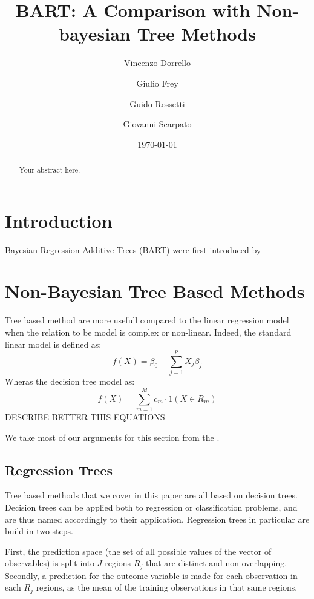 \documentclass[a4paper,11pt]{article}
\title{BART: A Comparison with Non-bayesian Tree Methods}
\author{
    Vincenzo Dorrello 
    \and
    Giulio Frey 
    \and
    Guido Rossetti 
    \and
    Giovanni Scarpato 
}
\date{\today}
\begin{document}
\maketitle

\begin{abstract}
Your abstract here.
\end{abstract}


\section{Introduction}

Bayesian Regression Additive Trees (BART) were first introduced by \cite{chipmanBARTBayesianAdditive2010}

\section{Non-Bayesian Tree Based Methods}

Tree based method are more usefull compared to the linear regression model when the relation to be model is complex or non-linear. Indeed, the standard linear model is defined as:
\begin{equation}
  f(X) = \beta_0 + \sum_{j=1}^p X_j \beta_j
\end{equation}
Wheras the decision tree model as:
\begin{equation}
  f(X) = \sum_{m=1}^M c_m \cdot 1(X \in R_m)
\end{equation}
DESCRIBE BETTER THIS EQUATIONS

We take most of our arguments for this section from the \cite[Chapter~8]{jamesIntroductionStatisticalLearning2021}.

\subsection{Regression Trees}

Tree based methods that we cover in this paper are all based on decision trees. Decision trees can be applied both to regression or classification problems, and are thus named accordingly to their application. Regression trees in particular are build in two steps.

First, the prediction space (the set of all possible values of the vector of observables) is split into $J$ regions $R_j$ that are distinct and non-overlapping.  Secondly, a prediction for the outcome variable is made for each observation in each $R_j$ regions, as the mean of the training observations in that same regions.
\end{document}
